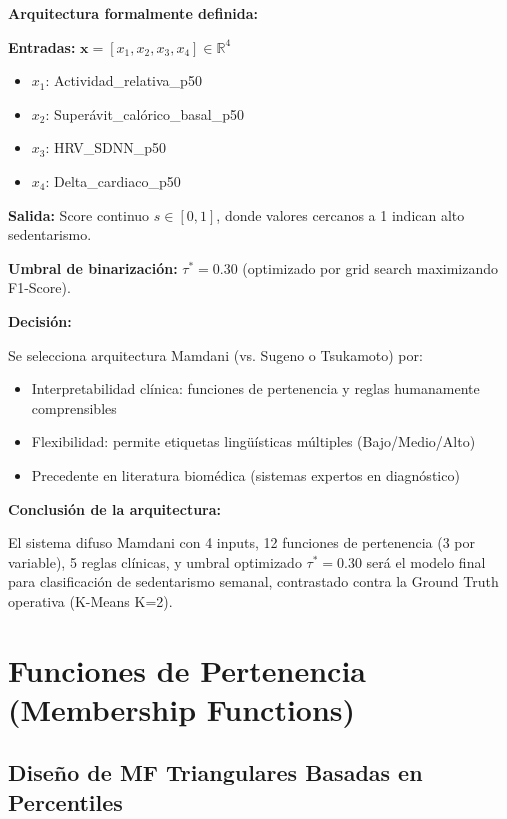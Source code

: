 \documentclass[12pt,letterpaper,twoside]{report}
\newcommand{\vect}[1]{\boldsymbol{#1}}
\begin{document}
\begin{calculobox}
\textbf{Arquitectura formalmente definida:}

\textbf{Entradas:} $\vect{x} = [x_1, x_2, x_3, x_4] \in \mathbb{R}^4$
\begin{itemize}[noitemsep]
    \item $x_1$: Actividad\_relativa\_p50
    \item $x_2$: Superávit\_calórico\_basal\_p50
    \item $x_3$: HRV\_SDNN\_p50
    \item $x_4$: Delta\_cardiaco\_p50
\end{itemize}

\textbf{Salida:} Score continuo $s \in [0,1]$, donde valores cercanos a 1 indican alto sedentarismo.

\textbf{Umbral de binarización:} $\tau^* = 0.30$ (optimizado por grid search maximizando F1-Score).
\end{calculobox}

\begin{decisionbox}
\textbf{Decisión:}

Se selecciona arquitectura Mamdani (vs. Sugeno o Tsukamoto) por:
\begin{itemize}[noitemsep]
    \item Interpretabilidad clínica: funciones de pertenencia y reglas humanamente comprensibles
    \item Flexibilidad: permite etiquetas lingüísticas múltiples (Bajo/Medio/Alto)
    \item Precedente en literatura biomédica (sistemas expertos en diagnóstico)
\end{itemize}
\end{decisionbox}

\begin{conclusionbox}
\textbf{Conclusión de la arquitectura:}

El sistema difuso Mamdani con 4 inputs, 12 funciones de pertenencia (3 por variable), 5 reglas clínicas, y umbral optimizado $\tau^* = 0.30$ será el modelo final para clasificación de sedentarismo semanal, contrastado contra la Ground Truth operativa (K-Means K=2).
\end{conclusionbox}

\section{Funciones de Pertenencia (Membership Functions)}

\subsection{Diseño de MF Triangulares Basadas en Percentiles}
\end{document}
